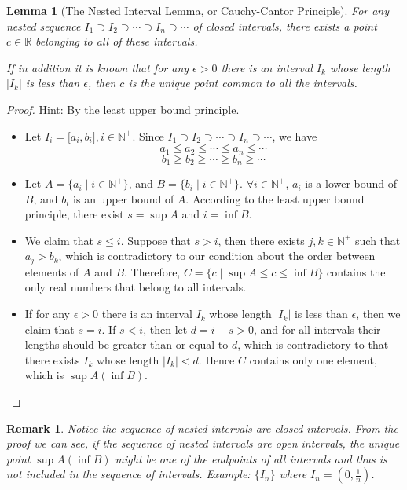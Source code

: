 \documentclass[onecolumn]{ctexart}
\newtheorem{lemma}{Lemma}
\newtheorem{remark}{Remark}
\begin{document}
\begin{lemma}[The Nested Interval Lemma, or Cauchy-Cantor Principle]
  For any nested sequence $I_1 \supset I_2 \supset \cdots \supset I_n \supset 
  \cdots$ of closed intervals, there exists a point $c \in \mathbb{R}$ belonging 
  to all of these intervals.

  If in addition it is known that for any $\epsilon > 0$ there is an interval 
  $I_k$ whose length $|I_k|$ is less than $\epsilon$, then $c$ is the unique 
  point common to all the intervals.
\end{lemma}
\begin{proof}
  Hint: By the least upper bound principle.
  \begin{itemize}
    \item Let $I_i = \lbrack a_i, b_i \rbrack, i \in \mathbb{N}^+$. Since $I_1 
    \supset I_2 \supset \cdots \supset I_n \supset \cdots$, we have
    \[
      a_1 \leq a_2 \leq \cdots \leq a_n \leq \cdots
    \]
    \[
      b_1 \geq b_2 \geq \cdots \geq b_n \geq \cdots
    \]
    \item Let $A = \lbrace a_i \mid i \in \mathbb{N}^+ \rbrace$, and $B = \lbrace 
    b_i \mid i \in \mathbb{N}^+ \rbrace$. $\forall i \in \mathbb{N}^+$, $a_i$ is 
    a lower bound of $B$, and $b_i$ is an upper bound of $A$. According to the 
    least upper bound principle, there exist $s = \sup A$ and $i = \inf B$.
    \item We claim that $s \leq i$. Suppose that $s > i$, then there exists $j, k 
    \in \mathbb{N}^+$ such that $a_j > b_k$, which is contradictory to our 
    condition about the order between elements of $A$ and $B$. Therefore, $C = 
    \lbrace c \mid \sup A \leq c \leq \inf B \rbrace$ contains the only real 
    numbers that belong to all intervals.
    \item If for any $\epsilon > 0$ there is an interval $I_k$ whose length 
    $|I_k|$ is less than $\epsilon$, then we claim that $s = i$. If $s < i$, then 
    let $d = i - s > 0$, and for all intervals their lengths should be greater 
    than or equal to $d$, which is contradictory to that there exists $I_k$ whose 
    length $|I_k| < d$. Hence $C$ contains only one element, which is $\sup A 
    (\inf B)$.
  \end{itemize}
\end{proof}
\begin{remark}
  Notice the sequence of nested intervals are closed intervals. From the proof we 
  can see, if the sequence of nested intervals are open intervals, the unique 
  point $\sup A (\inf B)$ might be one of the endpoints of all intervals and thus 
  is not included in the sequence of intervals. Example: $\lbrace I_n \rbrace$ 
  where $I_n = (0, \frac{1}{n})$.
\end{remark}
\end{document}
